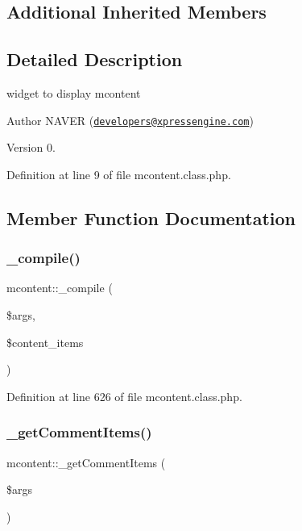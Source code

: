 \subsection*{Additional Inherited Members}


\subsection{Detailed Description}
widget to display mcontent 

\begin{DoxyAuthor}{Author}
N\+A\+V\+ER (\href{mailto:developers@xpressengine.com}{\tt developers@xpressengine.\+com}) 
\end{DoxyAuthor}
\begin{DoxyVersion}{Version}
0. 
\end{DoxyVersion}


Definition at line 9 of file mcontent.\+class.\+php.



\subsection{Member Function Documentation}
\hypertarget{classmcontent_ad31110bd1251e8de6256b26c279f32c9}{}\label{classmcontent_ad31110bd1251e8de6256b26c279f32c9} 
\subsubsection{\texorpdfstring{\+\_\+compile()}{\_compile()}}
{\footnotesize\ttfamily mcontent\+::\+\_\+compile (\begin{DoxyParamCaption}\item[{}]{\$args,  }\item[{}]{\$content\+\_\+items }\end{DoxyParamCaption})}



Definition at line 626 of file mcontent.\+class.\+php.

\hypertarget{classmcontent_a6a077425294207e1e357668b82e30bbf}{}\label{classmcontent_a6a077425294207e1e357668b82e30bbf} 
\subsubsection{\texorpdfstring{\+\_\+get\+Comment\+Items()}{\_getCommentItems()}}
{\footnotesize\ttfamily mcontent\+::\+\_\+get\+Comment\+Items (\begin{DoxyParamCaption}\item[{}]{\$args }\end{DoxyParamCaption})}



